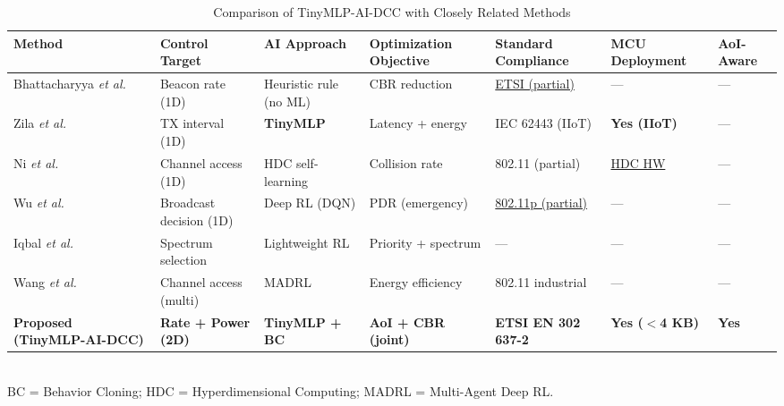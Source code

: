 \documentclass[journal]{IEEEtran}
\begin{document}
\begin{table}[!t]
  \centering
  \caption{Comparison of TinyMLP-AI-DCC with Closely Related Methods}
  \label{tab:related_work}
  \renewcommand{\arraystretch}{1.25}
  \begin{tabular}{L{2.6cm} C{2.2cm} C{2.2cm} C{2.8cm} C{2.2cm} C{2.0cm} C{1.6cm}}
    \toprule
    \textbf{Method}
      & \textbf{Control Target}
      & \textbf{AI Approach}
      & \textbf{Optimization Objective}
      & \textbf{Standard Compliance}
      & \textbf{MCU Deployment}
      & \textbf{AoI-Aware} \\
    \midrule
    Bhattacharyya \emph{et al.}~\cite{Bhattacharyya2024}
      & Beacon rate (1D)
      & Heuristic rule (no ML)
      & CBR reduction
      & \underline{ETSI (partial)}
      & ---
      & --- \\
    Zila \emph{et al.}~\cite{Zila2026}
      & TX interval (1D)
      & \textbf{TinyMLP}
      & Latency + energy
      & IEC 62443 (IIoT)
      & \textbf{Yes (IIoT)}
      & --- \\
    Ni \emph{et al.}~\cite{Ni2024}
      & Channel access (1D)
      & HDC self-learning
      & Collision rate
      & 802.11 (partial)
      & \underline{HDC HW}
      & --- \\
    Wu \emph{et al.}~\cite{Wu2025}
      & Broadcast decision (1D)
      & Deep RL (DQN)
      & PDR (emergency)
      & \underline{802.11p (partial)}
      & ---
      & --- \\
    Iqbal \emph{et al.}~\cite{Iqbal2025}
      & Spectrum selection
      & Lightweight RL
      & Priority + spectrum
      & ---
      & ---
      & --- \\
    Wang \emph{et al.}~\cite{Wang2024}
      & Channel access (multi)
      & MADRL
      & Energy efficiency
      & 802.11 industrial
      & ---
      & --- \\
    \midrule
    \textbf{Proposed (TinyMLP-AI-DCC)}
      & \textbf{Rate + Power (2D)}
      & \textbf{TinyMLP + BC}
      & \textbf{AoI + CBR (joint)}
      & \textbf{ETSI EN 302 637-2}
      & \textbf{Yes ($<$4 KB)}
      & \textbf{Yes} \\
    \bottomrule
  \end{tabular}
  \smallskip\\
  \small BC = Behavior Cloning; HDC = Hyperdimensional Computing; MADRL = Multi-Agent Deep RL.
\end{table}
\end{document}
